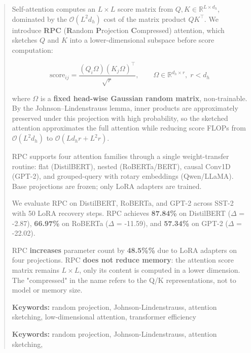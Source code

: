 \documentclass{article}
\begin{document}
\maketitle

\begin{abstract}
Self-attention computes an $L \times L$ score matrix from $Q, K \in \mathbb{R}^{L \times d_h}$, 
dominated by the $\mathcal{O}(L^2 d_h)$ cost of the matrix product $Q K^\top$. 
We introduce \textbf{RPC} (\textbf{R}andom \textbf{P}rojection \textbf{C}ompressed) attention, 
which sketches $Q$ and $K$ into a lower-dimensional subspace before score 
computation:

\[
\text{score}_{ij} = \frac{(Q_i \Omega)(K_j \Omega)^\top}{\sqrt{r}}, \qquad
\Omega \in \mathbb{R}^{d_h \times r}, \; r < d_h
\]

where $\Omega$ is a \textbf{fixed head-wise Gaussian random matrix}, non-trainable. 
By the Johnson--Lindenstrauss lemma, inner products are approximately preserved 
under this projection with high probability, so the sketched attention 
approximates the full attention while reducing score FLOPs from 
$\mathcal{O}(L^2 d_h)$ to $\mathcal{O}(L d_h r + L^2 r)$.

RPC supports four attention families through a single weight-transfer 
routine: flat (DistilBERT), nested (RoBERTa/BERT), causal Conv1D (GPT-2), 
and grouped-query with rotary embeddings (Qwen/LLaMA). Base projections 
are frozen; only LoRA adapters are trained.

We evaluate RPC on DistilBERT, RoBERTa, and GPT-2 across SST-2 with 
50 LoRA recovery steps. RPC achieves \textbf{87.84\%} on 
DistilBERT ($\Delta$ = -2.87), \textbf{66.97\%} on RoBERTa ($\Delta$ = -11.59), 
and \textbf{57.34\%} on GPT-2 ($\Delta$ = -22.02).

RPC \textbf{increases} parameter count by \textbf{48.5\%\%} due to LoRA 
adapters on four projections. RPC \textbf{does not reduce memory}: the attention 
score matrix remains $L \times L$, only its content is computed in a lower 
dimension. The "compressed" in the name refers to the Q/K representations, 
not to model or memory size.

\textbf{Keywords:} random projection, Johnson-Lindenstrauss, attention sketching, 
low-dimensional attention, transformer efficiency



\vspace{0.5em}
\noindent\textbf{Keywords:} random projection, Johnson-Lindenstrauss, attention sketching,
\end{abstract}
\end{document}
